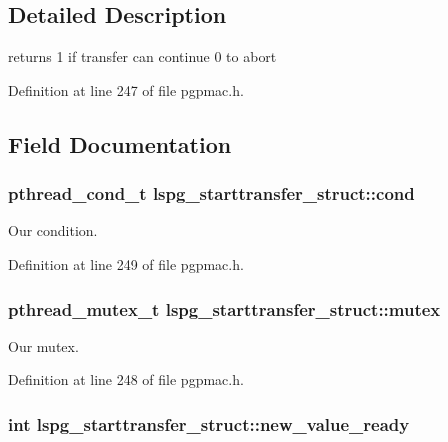 \subsection{Detailed Description}
returns 1 if transfer can continue 0 to abort 

Definition at line 247 of file pgpmac.\-h.



\subsection{Field Documentation}
\hypertarget{structlspg__starttransfer__struct_a1a569a2afabd7910219ff9d2d48c1b38}{
\subsubsection[{cond}]{\setlength{\rightskip}{0pt plus 5cm}pthread\-\_\-cond\-\_\-t lspg\-\_\-starttransfer\-\_\-struct\-::cond}}\label{structlspg__starttransfer__struct_a1a569a2afabd7910219ff9d2d48c1b38}


Our condition. 



Definition at line 249 of file pgpmac.\-h.

\hypertarget{structlspg__starttransfer__struct_a47824bb2701a699d43a7a916e2010705}{
\subsubsection[{mutex}]{\setlength{\rightskip}{0pt plus 5cm}pthread\-\_\-mutex\-\_\-t lspg\-\_\-starttransfer\-\_\-struct\-::mutex}}\label{structlspg__starttransfer__struct_a47824bb2701a699d43a7a916e2010705}


Our mutex. 



Definition at line 248 of file pgpmac.\-h.

\hypertarget{structlspg__starttransfer__struct_ad3a6356e5ccce15c982ddecf9634999f}{
\subsubsection[{new\-\_\-value\-\_\-ready}]{\setlength{\rightskip}{0pt plus 5cm}int lspg\-\_\-starttransfer\-\_\-struct\-::new\-\_\-value\-\_\-ready}}\label{structlspg__starttransfer__struct_ad3a6356e5ccce15c982ddecf9634999f}


